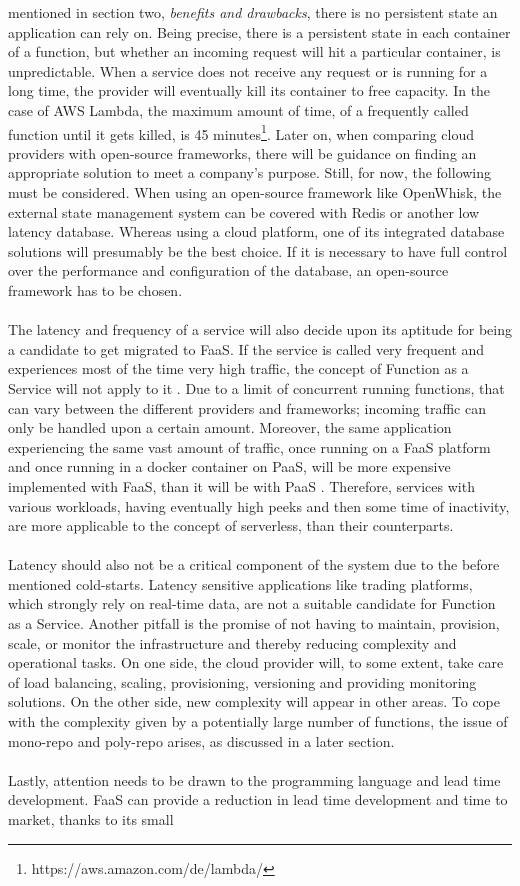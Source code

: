 \documentclass[a4paper,11pt, pagesize]{scrartcl}
\begin{document}
\begin{spacing}{1.2}
mentioned in section two, \textit{benefits and drawbacks}, there is no persistent state an application can rely on. Being precise, there is a persistent state in each container of a function, but whether an incoming request will hit a particular container, is unpredictable. When a service does not receive any request or is running for a long time, the provider will eventually kill its container to free capacity. In the case of AWS Lambda, the maximum amount of time, of a frequently called function until it gets killed, is 45 minutes\footnote{https://aws.amazon.com/de/lambda/}. Later on, when comparing cloud providers with open-source frameworks, there will be guidance on finding an appropriate solution to meet a company's purpose. Still, for now, the following must be considered. When using an open-source framework like OpenWhisk, the external state management system can be covered with Redis or another low latency database. Whereas using a cloud platform, one of its integrated database solutions will presumably be the best choice. If it is necessary to have full control over the performance and configuration of the database, an open-source framework has to be chosen.\\\\ The latency and frequency of a service will also decide upon its aptitude for being a candidate to get migrated to FaaS. If the service is called very frequent and experiences most of the time very high traffic, the concept of Function as a Service will not apply to it \cite{jonas2019cloud}. Due to a limit of concurrent running functions, that can vary between the different providers and frameworks; incoming traffic can only be handled upon a certain amount. Moreover, the same application experiencing the same vast amount of traffic, once running on a FaaS platform and once running in a docker container on PaaS, will be more expensive implemented with FaaS, than it will be with PaaS \cite{jonas2019cloud}. Therefore, services with various workloads, having eventually high peeks and then some time of inactivity, are more applicable to the concept of serverless, than their counterparts.\\\\ Latency should also not be a critical component of the system due to the before mentioned cold-starts. Latency sensitive applications like trading platforms, which strongly rely on real-time data, are not a suitable candidate for Function as a Service. Another pitfall is the promise of not having to maintain, provision, scale, or monitor the infrastructure and thereby reducing complexity and operational tasks. On one side, the cloud provider will, to some extent, take care of load balancing, scaling, provisioning, versioning and providing monitoring solutions. On the other side, new complexity will appear in other areas. To cope with the complexity given by a potentially large number of functions, the issue of mono-repo and poly-repo arises, as discussed in a later section.\\\\ Lastly, attention needs to be drawn to the programming language and lead time development. FaaS can provide a reduction in lead time development and time to market, thanks to its small 
\end{spacing}
\end{document}
